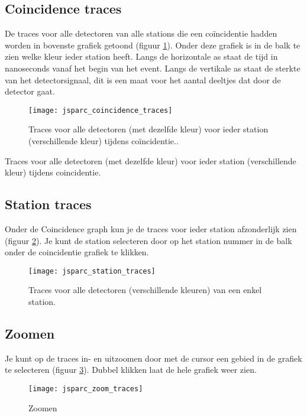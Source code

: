 \subsection{Coincidence traces}

De traces voor alle detectoren van alle stations die een co\"incidentie hadden
worden in bovenste grafiek getoond (figuur \ref{fig:stationtrace}). Onder deze grafiek is in de balk te zien 
welke kleur ieder station heeft.  Langs de horizontale as staat de tijd in 
nanoseconds vanaf het begin van het event. Langs de vertikale as staat de 
sterkte van het detectorsignaal, dit is een maat voor het aantal deeltjes dat 
door de detector gaat.

\begin{figure}[ht]
    \centering
    \texttt{[image: jsparc\_coincidence\_traces]}
    \caption{Traces voor alle detectoren (met dezelfde kleur) voor ieder station 
                 (verschillende kleur) tijdens co\"incidentie..}
    \label{fig:stationtrace}
\end{figure}

   Traces voor alle detectoren (met dezelfde kleur) voor ieder station 
   (verschillende kleur) tijdens coincidentie.
   
\subsection{Station traces}

Onder de Coincidence graph kun je de traces voor ieder station afzonderlijk 
zien (figuur \ref{fig:detectortrace}). Je kunt de station selecteren door op het station nummer in de balk 
onder de coincidentie grafiek te klikken.

\begin{figure}[ht]
    \centering
    \texttt{[image: jsparc\_station\_traces]}
    \caption{Traces voor alle detectoren (verschillende kleuren) van een enkel station.}
    \label{fig:detectortrace}
\end{figure}

\subsection{Zoomen}

Je kunt op de traces in- en uitzoomen door met de cursor een gebied in de 
grafiek te selecteren (figuur \ref{fig:zoomen}). Dubbel klikken laat de hele grafiek weer zien.

\begin{figure}[ht]
    \centering
    \texttt{[image: jsparc\_zoom\_traces]}
    \caption{Zoomen}
    \label{fig:zoomen}
\end{figure}


